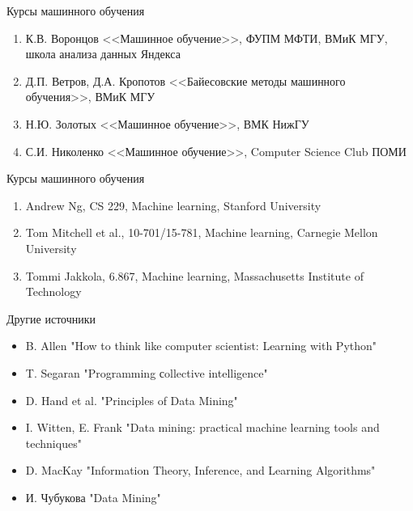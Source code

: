 \documentclass[compress,red,unicode]{beamer}
\begin{document}
\begin{frame}{Курсы машинного обучения}
\begin{enumerate}
	\item К.В. Воронцов <<Машинное обучение>>, ФУПМ МФТИ, ВМиК МГУ, школа анализа данных Яндекса
	\item Д.П. Ветров, Д.А. Кропотов <<Байесовские методы машинного обучения>>, ВМиК МГУ
	\item Н.Ю. Золотых <<Машинное обучение>>, ВМК НижГУ
	\item С.И. Николенко <<Машинное обучение>>, Computer Science Club ПОМИ
\end{enumerate}

\end{frame}

\begin{frame}{Курсы машинного обучения}
\begin{enumerate}
\item Andrew Ng, CS 229, Machine learning, Stanford University
\item Tom Mitchell et al., 10-701/15-781, Machine learning, Carnegie Mellon University
\item Tommi Jakkola, 6.867, Machine learning, Massachusetts Institute of Technology

\end{enumerate}
\end{frame}

\begin{frame}{Другие источники}
\begin{itemize}
	\item B. Allen "How to think like computer scientist: Learning with Python"
	\item T. Segaran "Programming сollective intelligence"
\end{itemize}

\begin{itemize}
	\item D. Hand et al. "Principles of Data Mining"
	\item I. Witten, E. Frank "Data mining: practical machine learning tools and techniques"
	\item D. MacKay "Information Theory, Inference, and Learning Algorithms"
	\item И. Чубукова "Data Mining"
\end{itemize}

\end{frame}
\end{document}
